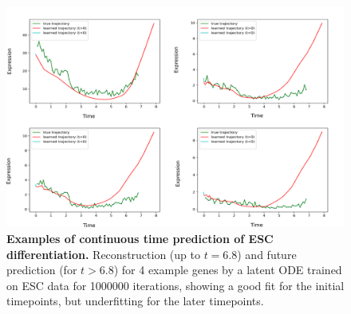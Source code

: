\begin{center}
\begin{figure}[H]
  \includegraphics[width=\linewidth]{./figures/latent_ode_val_underfit.png}
    \caption[Examples of continuous time prediction of ESC differentiation.]{\textbf{Examples of continuous time prediction of ESC differentiation.} Reconstruction (up to $t=6.8$) and future prediction (for $t>6.8$) for 4 example genes by a  latent ODE \citep{chen2018neural} trained on ESC data \citep{Klein2015} for 1000000 iterations, showing a good fit for the initial timepoints, but underfitting for the later timepoints.}
  \label{fig:figS9}
\end{figure}
\end{center}



